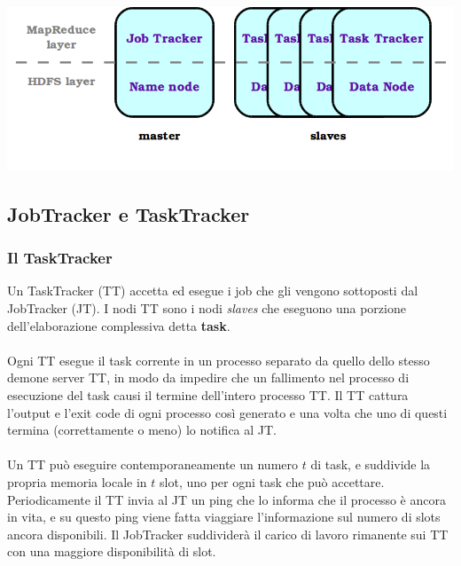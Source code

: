 \documentclass[a4paper,11pt]{report}
\begin{document}
\paragraph{}
\centerline{\includegraphics[width=150mm]{images/master-slaves-hadoop.png}} 
\subsection{JobTracker e TaskTracker}
\subsubsection{Il TaskTracker}
Un TaskTracker (TT) accetta ed esegue i job che gli vengono sottoposti dal JobTracker (JT). I nodi TT sono i nodi \emph{slaves} che eseguono
una porzione dell'elaborazione complessiva 
detta \textbf{task}.
\paragraph{}
Ogni TT esegue il task corrente in un processo separato da quello dello stesso demone server TT, in modo da impedire che un fallimento nel
processo di esecuzione del task
causi il termine dell'intero processo TT. Il TT cattura l'output e l'exit code di ogni processo così generato e una volta che uno di questi
termina (correttamente o meno) lo notifica
al JT. 
\paragraph{}
Un TT può eseguire contemporaneamente un numero $t$ di task, e suddivide la propria memoria locale in $t$ slot, uno per ogni task che può
accettare. Periodicamente il TT invia al JT
un ping che lo informa che il processo è ancora in vita, e su questo ping viene fatta viaggiare l'informazione sul numero di slots ancora
disponibili. Il JobTracker suddividerà il carico
di lavoro rimanente sui TT con una maggiore disponibilità di slot.
\end{document}
